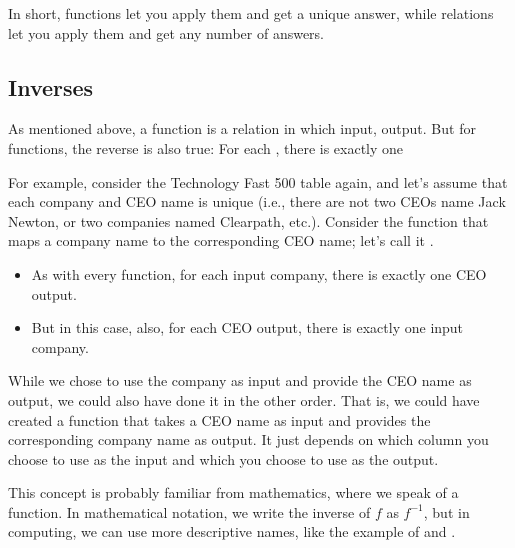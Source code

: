 \documentclass[letterpaper,10pt,english]{jupyterBook}
\begin{document}
\sphinxAtStartPar
In short, functions let you apply them and get a unique answer, while relations let you apply them and get any number of answers.


\subsection{Inverses}
\label{\detokenize{chapter-2-mathematical-foundations:inverses}}
\sphinxAtStartPar
As mentioned above, a function is a relation in which  input,  output.  But for  functions, the reverse is also true:  For each , there is exactly one 

\sphinxAtStartPar
For example, consider the Technology Fast 500 table again, and let’s assume that each company and CEO name is unique (i.e., there are not two CEOs name Jack Newton, or two companies named Clearpath, etc.).  Consider the function that maps a company name to the corresponding CEO name; let’s call it .
\begin{itemize}
\item {} 
\sphinxAtStartPar
As with every function, for each input company, there is exactly one CEO output.

\item {} 
\sphinxAtStartPar
But in this case, also, for each CEO output, there is exactly one input company.

\end{itemize}

\sphinxAtStartPar
While we chose to use the company as input and provide the CEO name as output, we could also have done it in the other order.  That is, we could have created a function  that takes a CEO name as input and provides the corresponding company name as output.  It just depends on which column you choose to use as the input and which you choose to use as the output.

\sphinxAtStartPar
This concept is probably familiar from mathematics, where we speak of  a function.  In mathematical notation, we write the inverse of \(f\) as \(f^{-1}\), but in computing, we can use more descriptive names, like the example of  and .
\end{document}
